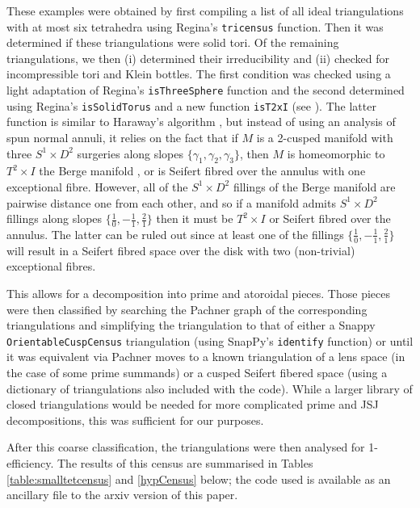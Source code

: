 \documentclass[12pt,reqno]{amsart}  %
\theoremstyle{definition}
\theoremstyle{remark}
\begin{document}
These examples were obtained by first compiling a list of all ideal 
triangulations with at most six tetrahedra using Regina's {\tt tricensus} 
function. Then it was determined if these triangulations were solid tori. 
Of the remaining triangulations, we then (i) determined their irreducibility 
and (ii) checked for incompressible tori and Klein bottles. The first 
condition was checked using a light adaptation of Regina's 
{\tt isThreeSphere} function and the second determined using Regina's 
{\tt isSolidTorus} and a new function {\tt isT2xI} (see \cite{regina}). 
The latter function is similar to Haraway's 
algorithm \cite[Corollary 15]{haraway2014determining}, but instead of 
using an analysis of spun normal  annuli, it relies on the fact that if 
$M$ is a 2-cusped manifold with three $S^1\times D^2$ surgeries along 
slopes $\{\gamma_1,\gamma_2,\gamma_3\}$, then $M$ is homeomorphic to 
$T^2 \times I$ the Berge manifold \cite{berge1991knots,gabai1989surgery}, 
or is Seifert fibred over the annulus with one exceptional fibre. However, 
all of the $S^1\times D^2$ fillings of the Berge manifold are 
pairwise distance one from each other, and so if a manifold admits 
$S^1\times D^2$ fillings along slopes 
$\{\frac{1}{0}, -\frac{1}{1}, \frac{2}{1}\}$ 
then it must be $T^2\times I$ or Seifert fibred over the annulus. 
The latter can be ruled out since at least one of the fillings 
$\{\frac{1}{0}, -\frac{1}{1}, \frac{2}{1}\}$ will result in a Seifert 
fibred space over the disk with two (non-trivial) exceptional fibres.

This allows for a decomposition into prime and atoroidal pieces. Those 
pieces were then classified by searching the Pachner graph of the 
corresponding triangulations and simplifying the triangulation to that 
of either a Snappy {\tt OrientableCuspCensus} triangulation (using 
SnapPy's {\tt identify} function) or until it was equivalent via Pachner 
moves to a known triangulation of a lens space (in the case of some prime 
summands) or a cusped Seifert fibered space (using a dictionary of 
triangulations also included with the code). While a larger library of 
closed triangulations would be needed for more complicated prime and 
JSJ decompositions, this was sufficient for our purposes. 

After this coarse classification, the triangulations were then analysed 
for 1-efficiency. The results of this census are summarised in 
Tables \ref{table:smalltetcensus} and \ref{hypCensus} below;
the code used is available as an ancillary file to the arxiv version 
of this paper. 
\end{document}
